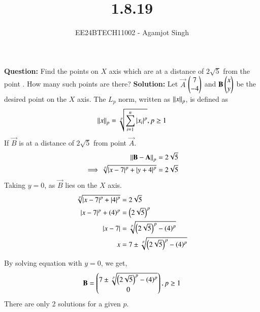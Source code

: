 \documentclass[journal]{IEEEtran}
\begin{document}

\vspace{3cm}

\title{1.8.19}
\author{EE24BTECH11002 - Agamjot Singh}
{\let\newpage\relax\maketitle}
\renewcommand{\thefigure}{\theenumi}
\renewcommand{\thetable}{\theenumi}
\setlength{\intextsep}{10pt} %

\textbf{Question:}
\newline
Find the points on $X$ axis which are at a distance of $2\sqrt{5}$ from the point . How many such points are there?
\newline
\textbf{Solution:}
\newline
Let $\vec{A}$ $\begin{pmatrix}7\\-4\end{pmatrix}$ and $\mathbf{B} \begin{pmatrix}x\\y\end{pmatrix}$ be the desired point on the $X$ axis.
\newline
The $L_p$ norm, written as $\left\lVert x\right\rVert_p$, is defined as
\begin{align}
	\left\lVert x\right\rVert_p = \sqrt[p]{\sum_{i=1}^{n}\left\vert x_i\right\vert^p}, p\geq 1
\end{align}
If $\vec{B}$ is at a distance of $2\sqrt{5}$ from point $\vec{A}$.
\begin{align}
	\left\lVert\mathbf{B} - \mathbf{A}\right\rVert_p &= 2\sqrt{5}\\
	\implies \sqrt[p]{\left\vert x - 7\right\vert^p + \left\vert y + 4\right\vert^p} &= 2\sqrt{5}\\
\end{align}
Taking $y = 0$, as $\vec{B}$ lies on the $X$ axis.
\begin{align}
	\sqrt[p]{\left\vert x - 7\right\vert^p + \left\vert4\right\vert^p} &= 2\sqrt{5}\\
	\left\vert x - 7\right\vert^p + \left(4\right)^p &= \left(2\sqrt{5}\right)^p\\
	\left\vert x - 7\right\vert &= \sqrt[p]{\left(2\sqrt{5}\right)^p - \left(4\right)^p}\\
	x &= 7 \pm \sqrt[p]{\left(2\sqrt{5}\right)^p - \left(4\right)^p}
\end{align}

By solving equation  with $y = 0$, we get,
\begin{align}
	\mathbf{B} = \begin{pmatrix}7 \pm \sqrt[p]{\left(2\sqrt{5}\right)^p - \left(4\right)^p}\\0\end{pmatrix}, p \geq 1 
\end{align} 
There are only 2 solutions for a given $p$.
\end{document}

